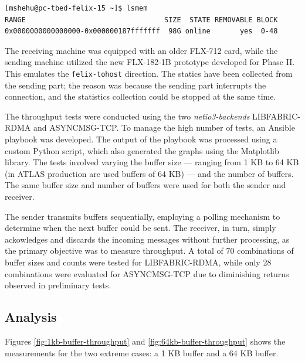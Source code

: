 \clearpage
\begin{lstlisting}[caption={Memory information}, label={lst:memory}]
[mshehu@pc-tbed-felix-15 ~]$ lsmem
RANGE                                 SIZE  STATE REMOVABLE BLOCK
0x0000000000000000-0x000000187fffffff  98G online       yes  0-48
\end{lstlisting}

The receiving machine was equipped with an older FLX-712 card, while the sending machine utilized the new FLX-182-1B prototype developed for Phase II. This emulates the \texttt{felix-tohost} direction. The statics have been collected from the sending part; the reason was because the sending part interrupts the connection, and the statistics collection could be stopped at the same time.

The throughput tests were conducted using the two \textit{netio3-backends} LIBFABRIC-RDMA and ASYNCMSG-TCP. To manage the high number of tests, an Ansible \cite{ansible} playbook was developed. The output of the playbook was processed using a custom Python script, which also generated the graphs using the Matplotlib \cite{matplotlib} library. The tests involved varying the buffer size --- ranging from 1 KB to 64 KB  (in ATLAS production are used buffers of 64 KB) --- and the number of buffers. The same buffer size and number of buffers were used for both the sender and receiver. 

The sender transmits buffers sequentially, employing a polling mechanism to determine when the next buffer could be sent. The receiver, in turn, simply ackowledges and discards the incoming messages without further processing, as the primary objective was to measure throughput. A total of 70 combinations of buffer sizes and counts were tested for LIBFABRIC-RDMA, while only 28 combinations were evaluated for ASYNCMSG-TCP due to diminishing returns observed in preliminary tests.

\subsection{Analysis}

Figures \ref{fig:1kb-buffer-throughput} and \ref{fig:64kb-buffer-throughput} shows the measurements for the two extreme cases: a 1 KB buffer and a 64 KB buffer.


